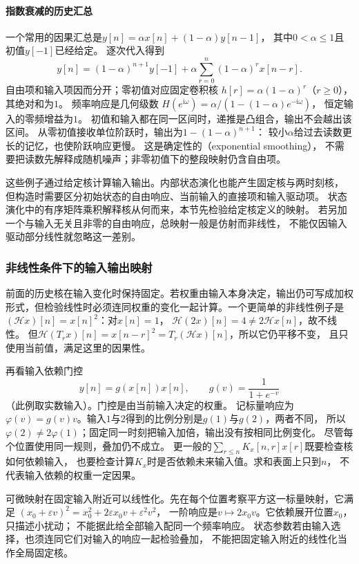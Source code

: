 \paragraph{指数衰减的历史汇总}
一个常用的因果汇总是$y[n]=\alpha x[n]+(1-\alpha)y[n-1]$，
其中$0<\alpha\leq1$且初值$y[-1]$已经给定。
逐次代入得到
\[
 y[n]=(1-\alpha)^{n+1}y[-1]
 +\alpha\sum_{r=0}^n(1-\alpha)^r x[n-r].
\]
自由项和输入项因而分开；零初值对应固定卷积核
$h[r]=\alpha(1-\alpha)^r$（$r\geq0$），其绝对和为$1$。
频率响应是几何级数
$H(e^{\mathrm i\omega})=\alpha/(1-(1-\alpha)e^{-\mathrm i\omega})$，
恒定输入的零频增益为$1$。
初值和输入都在同一区间时，递推是凸组合，输出不会越出该区间。
从零初值接收单位阶跃时，输出为$1-(1-\alpha)^{n+1}$：
较小$\alpha$给过去读数更长的记忆，也使阶跃响应更慢。
这是确定性的（exponential smoothing），
不需要把读数先解释成随机噪声；非零初值下的整段映射仍含自由项。

这些例子通过给定核计算输入输出。内部状态演化也能产生固定核与两时刻核，
但构造时需要区分初始状态的自由响应、当前输入的直接项和输入驱动项。
状态演化中的有序矩阵乘积解释核从何而来，本节先检验给定核定义的映射。
若另加一个与输入无关且非零的自由响应，总映射一般是仿射而非线性，
不能仅因输入驱动部分线性就忽略这一差别。

\subsubsection{非线性条件下的输入输出映射}

前面的历史核在输入变化时保持固定。若权重由输入本身决定，输出仍可写成加权
形式，但检验线性时必须连同权重的变化一起计算。一个更简单的非线性例子是$(\mathcal Hx)[n]=x[n]^2$：对$x[n]=1$，
$\mathcal H(2x)[n]=4\neq2\mathcal Hx[n]$，故不线性。
但$\mathcal H(T_rx)[n]=x[n-r]^2=T_r(\mathcal Hx)[n]$，所以它仍平移不变，
且只使用当前值，满足这里的因果性。

再看输入依赖门控
\[
  y[n]=g(x[n])x[n],\qquad g(v)=\frac1{1+e^{-v}}
\]
（此例取实数输入）。门控是由当前输入决定的权重。
记标量响应为$\varphi(v)=g(v)v$。输入$1$与$2$得到的比例分别是$g(1)$与$g(2)$，两者不同，
所以$\varphi(2)\neq2\varphi(1)$；固定同一时刻把输入加倍，输出没有按相同比例变化。
尽管每个位置使用同一规则，叠加仍不成立。
更一般的$\sum_{r\leq n}K_x[n,r]x[r]$既要检查核如何依赖输入，
也要检查计算$K_x$时是否依赖未来输入值。求和表面上只到$n$，
不代表输入依赖的权重一定因果。

可微映射在固定输入附近可以线性化。先在每个位置考察平方这一标量映射，它满足
$(x_0+\varepsilon v)^2=x_0^2+2\varepsilon x_0v+\varepsilon^2v^2$，
一阶响应是$v\mapsto2x_0v$。它依赖展开位置$x_0$，只描述小扰动；
不能据此给全部输入配同一个频率响应。
状态参数若由输入选择，也须连同它们对输入的响应一起检验叠加，
不能把固定输入附近的线性化当作全局固定核。

